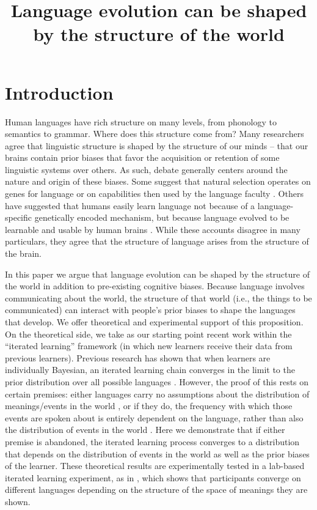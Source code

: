 \documentclass{apa}
\title{Language evolution can be shaped by the structure of the world}
\begin{document}
\maketitle

\section{Introduction}

Human languages have rich structure on many levels, from phonology to semantics to grammar. Where does this structure come from? Many researchers agree that linguistic structure is shaped by the structure of our minds -- that our brains contain prior biases that favor the acquisition or retention of some linguistic systems over others. As such, debate generally centers around the nature and origin of these biases. Some suggest that natural selection operates on genes for language \cite{pinkerbloom90,nowaketal01,komarovanowak01} or on capabilities then used by the language faculty \cite{hauseretal02}. Others have suggested that humans easily learn language not because of a language-specific genetically encoded mechanism, but because language evolved to be learnable and usable by human brains \cite{zuidema02,brightonetal05b,christiansenchater08}. While these accounts disagree in many particulars, they agree that the structure of language arises from the structure of the brain.

In this paper we argue that language evolution can be shaped by the structure of the world in addition to pre-existing cognitive biases. Because language involves communicating about the world, the structure of that world (i.e., the things to be communicated) can interact with people's prior biases to shape the languages that develop. We offer theoretical and experimental support of this proposition. On the theoretical side, we take as our starting point recent work within the ``iterated learning'' framework (in which new learners receive their data from previous learners). Previous research has shown that when learners are individually Bayesian, an iterated learning chain converges in the limit to the prior distribution over all possible languages \cite{griffithskalish05,griffithskalish07}.  However, the proof of this rests on certain premises: either languages carry no assumptions about the distribution of meanings/events in the world \cite{griffithskalish05}, or if they do, the frequency with which those events are spoken about is entirely dependent on the language, rather than also the distribution of events in the world \cite{griffithskalish07}. Here we demonstrate that if either premise is abandoned, the iterated learning process converges to a distribution that depends on the distribution of events in the world as well as the prior biases of the learner. These theoretical results are experimentally tested in a lab-based iterated learning experiment, as in , which shows that participants converge on different languages depending on the structure of the space of meanings they are shown.
\end{document}
